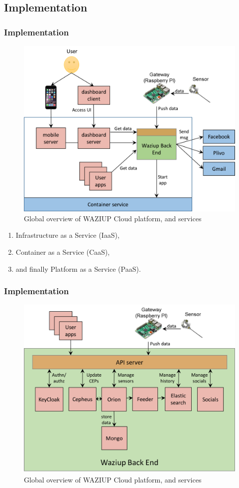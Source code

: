 \documentclass{beamer}
\begin{document}
\subsection{Implementation}

\begin{frame}
\frametitle{Implementation}

  \begin{figure}[H] 
  \centering  
  \includegraphics[width=.7\linewidth]{figures/CloudEnv.png}   
  \caption{Global overview of WAZIUP Cloud platform, and services}
  \label{fig-implem}  
  \end{figure}

  \begin{enumerate}
    \item Infrastructure as a Service (IaaS),    
    \item Container as a Service (CaaS),    
    \item and finally Platform as a Service (PaaS).
  \end{enumerate}

\end{frame}


\begin{frame}
\frametitle{Implementation}
 

  \begin{figure}[H] 
  \centering  
  \includegraphics[width=.7\linewidth]{figures/BackEnd.png}   
  \caption{Global overview of WAZIUP Cloud platform, and services}
  \label{fig-implem}  
  \end{figure}
\end{frame}
\end{document}
